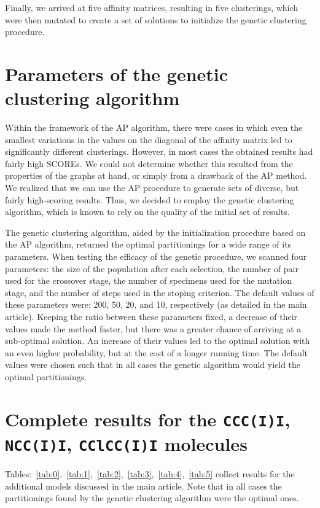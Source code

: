 \documentclass[a4paper,11pt,twoside]{book}%
\begin{document}
\begin{appendices}
Finally, we arrived at five affinity matrices, resulting in five clusterings, which were then mutated to create a set of solutions to initialize the genetic clustering procedure.

\section{Parameters of the genetic clustering algorithm}\label{sec:bootstrapping}

Within the framework of the AP algorithm, there were cases in which even the smallest variations in the values on the diagonal of the affinity matrix led to significantly different clusterings.
However, in most cases the obtained results had fairly high SCOREs. We could not determine whether this resulted from the properties of the graphs at hand, or simply from a drawback of the AP method.
We realized that we can use the AP procedure to generate sets of diverse, but fairly high-scoring results.
Thus, we decided to employ the genetic clustering algorithm, which is known to rely on the quality of the initial set of results.

The genetic clustering algorithm, aided by the initialization procedure based on the AP algorithm, returned the optimal partitionings for a wide range of its parameters.
When testing the efficacy of the genetic procedure, we scanned four parameters: the size of the population after each selection, the number of pair used for the crossover stage, the number of specimens used for the mutation stage, and the number of steps used in the stoping criterion.
The default values of these parameters were: 200, 50, 20, and 10, respectively (as detailed in the main article).
Keeping the ratio between these parameters fixed, a decrease of their values made the method faster, but there was a greater chance of arriving at a sub-optimal solution.
An increase of their values led to the optimal solution with an even higher probability, but at the cost of a longer running time.
The default values were chosen such that in all cases the genetic algorithm would yield the optimal partitionings.
  
\section{Complete results for the \texttt{CCC(I)I}, \texttt{NCC(I)I}, \texttt{CClCC(I)I} molecules}

Tables:~\ref{tab:0},~\ref{tab:1},~\ref{tab:2},~\ref{tab:3},~\ref{tab:4},~\ref{tab:5} collect results for the additional models discussed in the main article.
Note that in all cases the partitionings found by the genetic clustering algorithm were the optimal ones.


\end{appendices}
\end{document}
